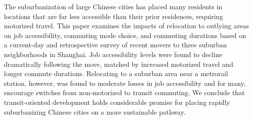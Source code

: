 The suburbanization of large Chinese cities has placed many residents in locations that are far less accessible than their prior residences, requiring motorized travel. This paper examines the impacts of relocation to outlying areas on job accessibility, commuting mode choice, and commuting durations based on a current-day and retrospective survey of recent movers to three suburban neighborhoods in Shanghai. Job accessibility levels were found to decline dramatically following the move, matched by increased motorized travel and longer commute durations. Relocating to a suburban area near a metrorail station, however, was found to moderate losses in job accessibility and for many, encourage switches from non-motorized to transit commuting. We conclude that transit-oriented development holds considerable promise for placing rapidly suburbanizing Chinese cities on a more sustainable pathway.
